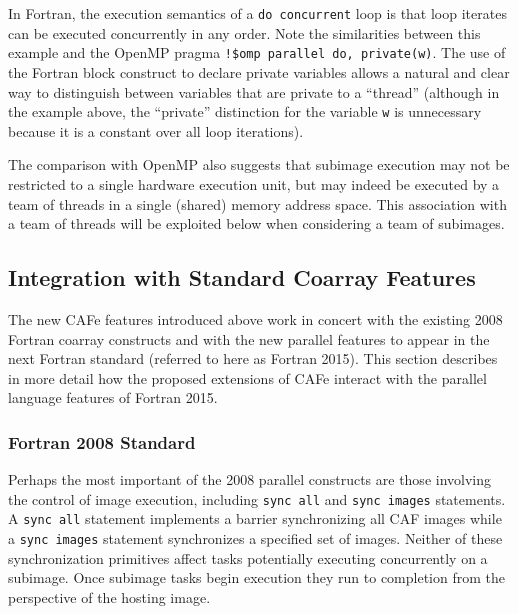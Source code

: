 In Fortran, the execution semantics of a \texttt{do concurrent} loop is that loop
iterates can be executed concurrently in any order.  Note the similarities between this
example and the OpenMP pragma \texttt{!\$omp parallel do, private(w)}.  The use of the
Fortran block construct to declare private variables allows a natural and clear way to
distinguish between variables that are private to a ``thread'' (although in the example
above, the ``private'' distinction for the variable \texttt{w} is unnecessary because it
is a constant over all loop iterations).

The comparison with OpenMP also suggests that subimage execution may not be restricted to
a single hardware execution unit, but may indeed be executed by a team of threads in a
single (shared) memory address space.  This association with a team of threads will be
exploited below when considering a team of subimages.

\begin{comment}
  (NOTE FOR CRAIG: need to read the standard to see if a block construct can be used in this
way. ALSO, there is a lot more work here to think about how do concurrent merges with
OpenMP and OpenACC with regards to synchronization, barriers, teams, atomics, , critical
sections, ...)
\end{comment}


\subsection{Integration with Standard Coarray Features}

The new CAFe features introduced above work in concert with the existing 2008 Fortran
coarray constructs and with the new parallel features to appear in the next Fortran
standard\cite{TS:18508} (referred to here as Fortran 2015).  This section describes
in more detail how the proposed extensions of CAFe interact with the parallel
language features of Fortran 2015.

\subsubsection{Fortran 2008 Standard}

Perhaps the most important of the 2008 parallel constructs are those involving the
control of image execution, including \texttt{sync all} and \texttt{sync images}
statements.  A \texttt{sync all} statement implements a barrier synchronizing all CAF
images while a \texttt{sync images} statement synchronizes a specified set of images.
Neither of these synchronization primitives affect tasks potentially executing concurrently
on a subimage.  Once subimage tasks begin execution they run to completion from the perspective
of the hosting image.

